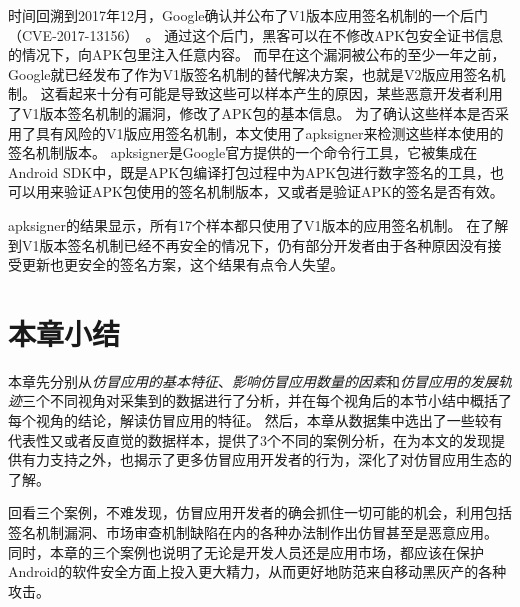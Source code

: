 时间回溯到2017年12月，Google确认并公布了V1版本应用签名机制的一个后门（CVE-2017-13156）~\cite{android_security_bulletin}。
通过这个后门，黑客可以在不修改APK包安全证书信息的情况下，向APK包里注入任意内容。
而早在这个漏洞被公布的至少一年之前，Google就已经发布了作为V1版签名机制的替代解决方案，也就是V2版应用签名机制。
这看起来十分有可能是导致这些可以样本产生的原因，某些恶意开发者利用了V1版本签名机制的漏洞，修改了APK包的基本信息。
为了确认这些样本是否采用了具有风险的V1版应用签名机制，本文使用了apksigner来检测这些样本使用的签名机制版本。
apksigner是Google官方提供的一个命令行工具，它被集成在Android SDK中，既是APK包编译打包过程中为APK包进行数字签名的工具，也可以用来验证APK包使用的签名机制版本，又或者是验证APK的签名是否有效。

apksigner的结果显示，所有17个样本都只使用了V1版本的应用签名机制。
在了解到V1版本签名机制已经不再安全的情况下，仍有部分开发者由于各种原因没有接受更新也更安全的签名方案，这个结果有点令人失望。

\section{本章小结}
本章先分别从\emph{仿冒应用的基本特征}、\emph{影响仿冒应用数量的因素}和\emph{仿冒应用的发展轨迹}三个不同视角对采集到的数据进行了分析，并在每个视角后的本节小结中概括了每个视角的结论，解读仿冒应用的特征。
然后，本章从数据集中选出了一些较有代表性又或者反直觉的数据样本，提供了3个不同的案例分析，在为本文的发现提供有力支持之外，也揭示了更多仿冒应用开发者的行为，深化了对仿冒应用生态的了解。

回看三个案例，不难发现，仿冒应用开发者的确会抓住一切可能的机会，利用包括签名机制漏洞、市场审查机制缺陷在内的各种办法制作出仿冒甚至是恶意应用。
同时，本章的三个案例也说明了无论是开发人员还是应用市场，都应该在保护Android的软件安全方面上投入更大精力，从而更好地防范来自移动黑灰产的各种攻击。
